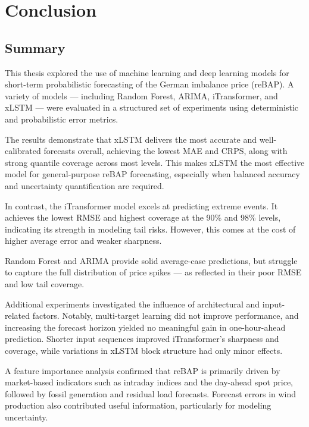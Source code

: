 \documentclass[class=scrbook, crop=false]{standalone}
\begin{document}
\chapter{Conclusion} %
\label{Chapter::Conclusion}

\section{Summary}
\label{Section::Summary}
This thesis explored the use of machine learning and deep learning models for short-term probabilistic forecasting of the German imbalance price (reBAP). A variety of models — including Random Forest, ARIMA, iTransformer, and xLSTM — were evaluated in a structured set of experiments using deterministic and probabilistic error metrics.

The results demonstrate that xLSTM delivers the most accurate and well-calibrated forecasts overall, achieving the lowest MAE and CRPS, along with strong quantile coverage across most levels. This makes xLSTM the most effective model for general-purpose reBAP forecasting, especially when balanced accuracy and uncertainty quantification are required.

In contrast, the iTransformer model excels at predicting extreme events. It achieves the lowest RMSE and highest coverage at the 90\% and 98\% levels, indicating its strength in modeling tail risks. However, this comes at the cost of higher average error and weaker sharpness.

Random Forest and ARIMA provide solid average-case predictions, but struggle to capture the full distribution of price spikes — as reflected in their poor RMSE and low tail coverage. 

Additional experiments investigated the influence of architectural and input-related factors. Notably, multi-target learning did not improve performance, and increasing the forecast horizon yielded no meaningful gain in one-hour-ahead prediction. Shorter input sequences improved iTransformer’s sharpness and coverage, while variations in xLSTM block structure had only minor effects.

A feature importance analysis confirmed that reBAP is primarily driven by market-based indicators such as intraday indices and the day-ahead spot price, followed by fossil generation and residual load forecasts. Forecast errors in wind production also contributed useful information, particularly for modeling uncertainty.
\end{document}
